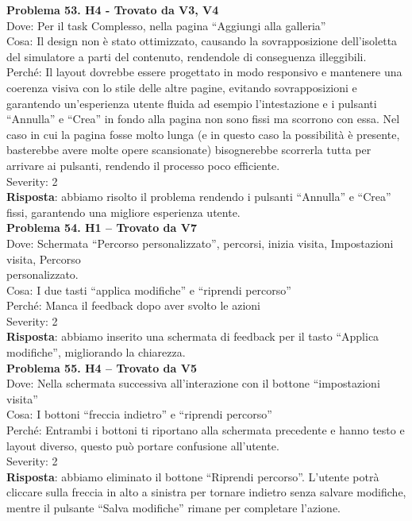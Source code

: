 \documentclass{article}
\begin{document}
\noindent \textbf{Problema 53. H4 - Trovato da V3, V4} \\
Dove: Per il task Complesso, nella pagina “Aggiungi alla galleria” \\
Cosa: Il design non è stato ottimizzato, causando la sovrapposizione dell'isoletta del simulatore a parti del contenuto, rendendole di conseguenza illeggibili. \\
Perché: Il layout dovrebbe essere progettato in modo responsivo e mantenere una coerenza visiva con lo stile delle altre pagine, evitando sovrapposizioni e garantendo un’esperienza utente fluida ad esempio l’intestazione e i pulsanti “Annulla” e “Crea” in fondo alla pagina non sono fissi ma scorrono con essa. Nel caso in cui la pagina fosse molto lunga (e in questo caso la possibilità è presente, basterebbe avere molte opere scansionate) bisognerebbe scorrerla tutta per arrivare ai pulsanti, rendendo il processo poco efficiente. \\
Severity: 2 \\
\textbf{Risposta}: abbiamo risolto il problema rendendo i pulsanti “Annulla” e “Crea” fissi, garantendo una migliore esperienza utente.\\

\noindent \textbf{Problema 54. H1 – Trovato da V7} \\
Dove: Schermata “Percorso personalizzato”, percorsi, inizia visita, Impostazioni visita, Percorso\\  personalizzato. \\
Cosa: I due tasti “applica modifiche” e “riprendi percorso” \\
Perché: Manca il feedback dopo aver svolto le azioni \\
Severity: 2 \\
\textbf{Risposta}: abbiamo inserito una schermata di feedback per il tasto “Applica modifiche”, migliorando la chiarezza.\\

\noindent \textbf{Problema 55. H4 – Trovato da V5} \\
Dove: Nella schermata successiva all’interazione con il bottone “impostazioni visita” \\
Cosa: I bottoni “freccia indietro” e “riprendi percorso” \\
Perché: Entrambi i bottoni ti riportano alla schermata precedente e hanno testo e layout diverso, questo può portare confusione all’utente. \\
Severity: 2 \\
\textbf{Risposta}: abbiamo eliminato il bottone “Riprendi percorso”. L’utente potrà cliccare sulla freccia in alto a sinistra per tornare indietro senza salvare modifiche, mentre il pulsante “Salva modifiche” rimane per completare l’azione.\\
\end{document}
